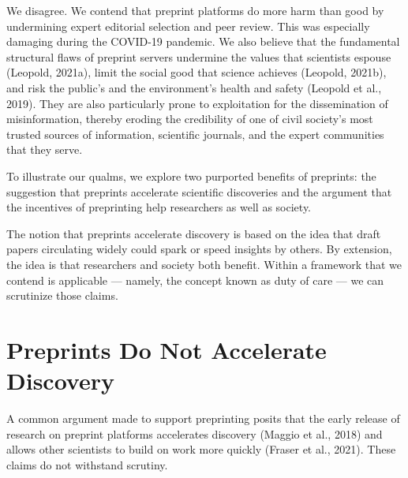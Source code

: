 \documentclass[authordate, empirical]{jote-new-article}
\begin{document}
	We disagree. We contend that preprint platforms do more harm than good by undermining expert editorial selection and peer review. This was especially damaging during the COVID-19 pandemic. We also believe that the fundamental structural flaws of preprint servers undermine the values that scientists espouse (Leopold, 2021a), limit the social good that science achieves (Leopold, 2021b), and risk the public's and the environment's health and safety (Leopold et al., 2019). They are also particularly prone to exploitation for the dissemination of misinformation, thereby eroding the credibility of one of civil society's most trusted sources of information, scientific journals, and the expert communities that they serve.







	To illustrate our qualms, we explore two purported benefits of preprints: the suggestion that preprints accelerate scientific discoveries and the argument that the incentives of preprinting help researchers as well as society.







	The notion that preprints accelerate discovery is based on the idea that draft papers circulating widely could spark or speed insights by others. By extension, the idea is that researchers and society both benefit. Within a framework that we contend is applicable — namely, the concept known as duty of care — we can scrutinize those claims.







	\section{Preprints Do Not Accelerate Discovery}







	A common argument made to support preprinting posits that the early release of research on preprint platforms accelerates discovery (Maggio et al., 2018) and allows other scientists to build on work more quickly (Fraser et al., 2021). These claims do not withstand scrutiny.
\end{document}
